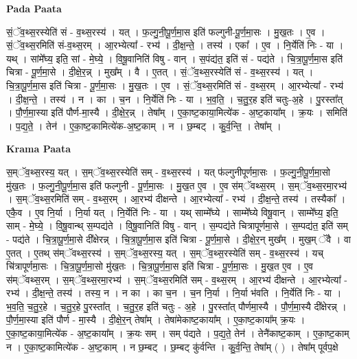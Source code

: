 \documentclass[17pt]{extarticle}
\begin{document}
\textbf{Pada Paata} \newline

सं॒ॅव॒थ्स॒रस्येति॑ सं - व॒थ्स॒रस्य॑ । यत् । फ॒ल्गु॒नी॒पू॒र्ण॒मा॒स इति॑ फल्गुनी-पू॒र्ण॒मा॒सः । मु॒ख॒तः । ए॒व । सं॒ॅव॒थ्स॒रमिति॑ सं-व॒थ्स॒रम् । आ॒रभ्येत्या᳚ - रभ्य॑ । दी॒क्ष॒न्ते॒ । तस्य॑ । एका᳚ । ए॒व । नि॒र्येति॑ निः - या । यथ् । सांमे᳚घ्य॒ इति॒ सां - मे॒घ्ये॒ । वि॒षू॒वानिति॑ विषु - वान् । स॒पंद्य॑त॒ इति॑ सं - पद्य॑ते । चि॒त्रा॒पू॒र्ण॒मा॒स इति॑ चित्रा - पू॒र्ण॒मा॒से । दी॒क्षे॒र॒न्न् । मुख᳚म् । वै । ए॒तत् । सं॒ॅव॒थ्स॒रस्येति॑ सं - व॒थ्स॒रस्य॑ । यत् । चि॒त्रा॒पू॒र्ण॒मा॒स इति॑ चित्रा - पू॒र्ण॒मा॒सः । मु॒ख॒तः । ए॒व । सं॒ॅव॒थ्स॒रमिति॑ सं - व॒थ्स॒रम् । आ॒रभ्येत्या᳚ - रभ्य॑ । दी॒क्ष॒न्ते॒ । तस्य॑ । न । का । च॒न । नि॒र्येति॑ निः - या । भ॒व॒ति॒ । च॒तु॒र॒ह इति॑ चतुः-अ॒हे । पु॒रस्ता᳚त् । पौ॒र्ण॒मा॒स्या इति॑ पौर्ण-मा॒स्यै । दी॒क्षे॒र॒न्न् । तेषा᳚म् । ए॒का॒ष्ट॒काया॒मित्ये॑क - अ॒ष्ट॒काया᳚म् । क्र॒यः । समिति॑ । प॒द्य॒ते॒ । तेन॑ । ए॒का॒ष्ट॒कामित्ये॑क-अ॒ष्ट॒काम् । न । छ॒म्बट् । कु॒र्व॒न्ति॒ । तेषा᳚म् ।  \newline


\textbf{Krama Paata} \newline

स॒म्ॅव॒थ्स॒रस्य॒ यत् । स॒म्ॅव॒थ्स॒रस्येति॑ सम् - व॒थ्स॒रस्य॑ । यत् फ॑ल्गुनीपूर्णमा॒सः । फ॒ल्गु॒नी॒पू॒र्ण॒मा॒सो मु॑ख॒तः । फ॒ल्गु॒नी॒पू॒र्ण॒मा॒स इति॑ फल्गुनी - पू॒र्ण॒मा॒सः । मु॒ख॒त ए॒व । ए॒व स॑म्ॅवथ्स॒रम् । स॒म्ॅव॒थ्स॒रमा॒रभ्य॑ । स॒म्ॅव॒थ्स॒रमिति॑ सम् - व॒थ्स॒रम् । आ॒रभ्य॑ दीक्षन्ते । आ॒रभ्येत्या᳚ - रभ्य॑ । दी॒क्ष॒न्ते॒ तस्य॑ । तस्यैका᳚ । एकै॒व । ए॒व नि॒र्या । नि॒र्या यत् । नि॒र्येति॑ निः - या । यथ् साम्मे᳚घ्ये । साम्मे᳚घ्ये विषू॒वान् । साम्मे᳚घ्य॒ इति॒ साम् - मे॒घ्ये॒ । वि॒षू॒वान्थ् स॒म्पद्य॑ते । वि॒षू॒वानिति॑ विषु - वान् । स॒म्पद्य॑ते चित्रापूर्णमा॒से । स॒म्पद्य॑त॒ इति॑ सम् - पद्य॑ते । चि॒त्रा॒पू॒र्ण॒मा॒से दी᳚क्षेरन्न् । चि॒त्रा॒पू॒र्ण॒मा॒स इति॑ चित्रा - पू॒र्ण॒मा॒से । दी॒क्षे॒र॒न् मुख᳚म् । मुख॒म् ॅवै । वा ए॒तत् । ए॒तथ् स॑म्ॅवथ्स॒रस्य॑ । स॒म्ॅव॒थ्स॒रस्य॒ यत् । स॒म्ॅव॒थ्स॒रस्येति॑ सम् - व॒थ्स॒रस्य॑ । यच् चि॑त्रापूर्णमा॒सः । चि॒त्रा॒पू॒र्ण॒मा॒सो मु॑ख॒तः । चि॒त्रा॒पू॒र्ण॒मा॒स इति॑ चित्रा - पू॒र्ण॒मा॒सः । मु॒ख॒त ए॒व । ए॒व स॑म्ॅवथ्स॒रम् । स॒म्ॅव॒थ्स॒रमा॒रभ्य॑ । स॒म्ॅव॒थ्स॒रमिति॑ सम् - व॒थ्स॒रम् । आ॒रभ्य॑ दीक्षन्ते । आ॒रभ्येत्या᳚ - रभ्य॑ । दी॒क्ष॒न्ते॒ तस्य॑ । तस्य॒ न । न का । का च॒न । च॒न नि॒र्या । नि॒र्या भ॑वति । नि॒र्येति॑ निः - या । भ॒व॒ति॒ च॒तु॒र॒हे । च॒तु॒र॒हे पु॒रस्ता᳚त् । च॒तु॒र॒ह इति॑ चतुः - अ॒हे । पु॒रस्ता᳚त् पौर्णमा॒स्यै । पौ॒र्ण॒मा॒स्यै दी᳚क्षेरन्न् । पौ॒र्ण॒मा॒स्या इति॑ पौर्ण - मा॒स्यै । दी॒क्षे॒र॒न् तेषा᳚म् । तेषा॑मेकाष्ट॒काया᳚म् । ए॒का॒ष्ट॒काया᳚म् क्र॒यः । ए॒का॒ष्ट॒काया॒मित्ये॑क - अ॒ष्ट॒काया᳚म् । क्र॒यः सम् । सम् प॑द्यते । प॒द्य॒ते॒ तेन॑ । तेनै॑काष्ट॒काम् । ए॒का॒ष्ट॒काम् न । ए॒का॒ष्ट॒कामित्ये॑क - अ॒ष्ट॒काम् । न छ॒म्बट् । छ॒म्बट् कु॑र्वन्ति । कु॒र्व॒न्ति॒ तेषा᳚म् ( ) । तेषा᳚म् पूर्वप॒क्षे \newline
\end{document}
